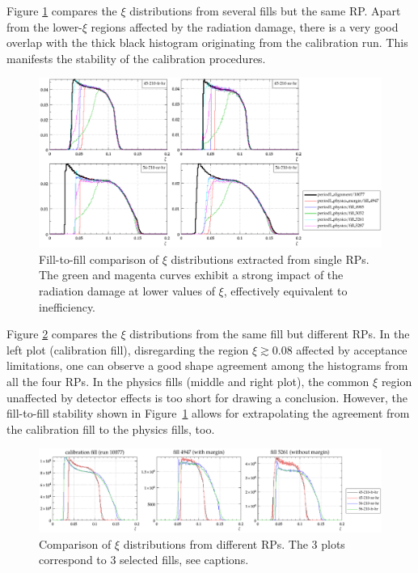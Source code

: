\documentclass[TOTEM]{cern/cernphprep}
\begin{document}
Figure \ref{fig:xi_cmp_run} compares the $\xi$ distributions from several fills but the same RP. Apart from the lower-$\xi$ regions affected by the radiation damage, there is a very good overlap with the thick black histogram originating from the calibration run. This manifests the stability of the calibration procedures.


\begin{figure}[h!]
\begin{center}
\includegraphics[width=\hsize]{fig/validation/xi_cmp_run.pdf}
\caption{%
Fill-to-fill comparison of $\xi$ distributions extracted from single RPs. The green and magenta curves exhibit a strong impact of the radiation damage at lower values of $\xi$, effectively equivalent to inefficiency.
}
\label{fig:xi_cmp_run}
\end{center}
\end{figure}


Figure \ref{fig:xi_cmp_rp} compares the $\xi$ distributions from the same fill but different RPs. In the left plot (calibration fill), disregarding the region $\xi\gtrsim 0.08$ affected by acceptance limitations, one can observe a good shape agreement among the histograms from all the four RPs. In the physics fills (middle and right plot), the common $\xi$ region unaffected by detector effects is too short for drawing a conclusion. However, the fill-to-fill stability shown in Figure~\ref{fig:xi_cmp_run} allows for extrapolating the agreement from the calibration fill to the physics fills, too.

\begin{figure}[h!]
\begin{center}
\includegraphics[width=\hsize]{fig/validation/xi_cmp_rp.pdf}
\caption{%
Comparison of $\xi$ distributions from different RPs. The 3 plots correspond to 3 selected fills, see captions.
}
\label{fig:xi_cmp_rp}
\end{center}
\end{figure}
\end{document}
